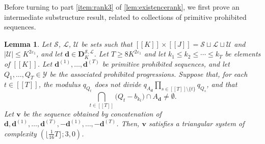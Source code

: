 \documentclass[11pt]{amsart}
\newtheorem{lemma}[theorem]{Lemma}
\theoremstyle{definition}
\renewcommand{\leq}{\leqslant}
\renewcommand{\geq}{\geqslant}
\newcommand{\sinterval}[1]{[\![#1]\!] }
\newcommand{\eps}{\varepsilon}
\renewcommand{\d}{\boldsymbol{d}}
\newcommand{\cstU}{2\eps_1}
\newcommand{\sommespart}{b}
\newcommand{\progression}{A_{\d}}
\newcommand{\lit}{\mathcal{L}}
\newcommand{\unlit}{\mathcal{U}}
\newcommand{\s}{\mathcal{S}}
\newcommand{\fancyD}{\mathbf{D}}
\newcommand{\Dss}{\fancyD^{\s,\lit}_{\!\repK}}
\renewcommand{\vec}{\boldsymbol}
\newcommand{\prohibprog}{\mathcal{Y}}
\newcommand{\modulus}{q}
\newcommand{\repK}{K}
\newcommand{\newK}{\sinterval{K}}
\newcommand{\newR}{\sinterval{J}}
\newcommand{\newerKR}{\newK\times\newR}
\newcommand{\ncond}{T}
\begin{document}
Before turning to part \cref{item:rank3} of \cref{lem:existencerank}, we first prove an intermediate substructure result, related to collections of primitive prohibited sequences.

\begin{lemma}
\label{lem:remainderterm}
Let $\s$, $\lit$, $\unlit$ be sets such that $\newerKR = \s\sqcup\lit\sqcup\unlit$ and $|\unlit| \leq\repK^{\cstU}$, and let $\d\in \Dss$. Let $\ncond \geq 8 \repK^{\cstU}$ and let $k_1\leq k_2\leq \cdots \leq k_{\ncond}$ be elements of $\sinterval{\repK}$. Let $\d^{(1)}, \ldots, \d^{(\ncond)}$ be primitive prohibited sequences, and let $Q_1, \ldots, Q_{\ncond}\in \prohibprog$ be the associated prohibited progressions. Suppose that, for each $t\in \sinterval{\ncond}$, the modulus $\modulus_{Q_t}$ does not divide $\modulus_{\progression}\prod_{s\in \sinterval{\ncond}\setminus \{t\}}\modulus_{Q_s}$, and that
\begin{equation*}
	\bigcap_{t\in \sinterval{\ncond}} \big(Q_t - \sommespart_{k_t}\big) \cap \progression \neq \emptyset.
\end{equation*}
Let $\vec{v}$ be the sequence obtained by concatenation of $\d, \d^{(1)}, \ldots, \d^{(\ncond)}, -\d^{(1)}, \ldots, -\d^{(\ncond)}$. Then, $\vec{v}$ satisfies a triangular system of complexity $(\lfloor \tfrac{1}{16}\ncond\rfloor; 3, 0)$.
\end{lemma}
\end{document}
